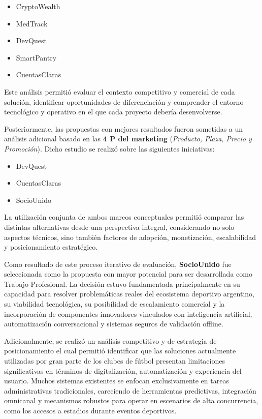 \begin{itemize}
    \item CryptoWealth
    \item MedTrack
    \item DevQuest
    \item SmartPantry
    \item CuentasClaras
\end{itemize}

\newpage

Este análisis permitió evaluar el contexto competitivo y comercial de cada solución, identificar oportunidades de diferenciación y comprender el entorno tecnológico y operativo en el que cada proyecto debería desenvolverse.

Posteriormente, las propuestas con mejores resultados fueron sometidas a un análisis adicional basado en las \textbf{4 P del marketing} (\textit{Producto, Plaza, Precio y Promoción}). Dicho estudio se realizó sobre las siguientes iniciativas:

\begin{itemize}
    \item DevQuest
    \item CuentasClaras
    \item SocioUnido
\end{itemize}

La utilización conjunta de ambos marcos conceptuales permitió comparar las distintas alternativas desde una perspectiva integral, considerando no solo aspectos técnicos, sino también factores de adopción, monetización, escalabilidad y posicionamiento estratégico.

Como resultado de este proceso iterativo de evaluación, \textbf{SocioUnido} fue seleccionada como la propuesta con mayor potencial para ser desarrollada como Trabajo Profesional. La decisión estuvo fundamentada principalmente en su capacidad para resolver problemáticas reales del ecosistema deportivo argentino, su viabilidad tecnológica, su posibilidad de escalamiento comercial y la incorporación de componentes innovadores vinculados con inteligencia artificial, automatización conversacional y sistemas seguros de validación offline.

Adicionalmente, se realizó un análisis competitivo y de estrategia de posicionamiento el cual permitió identificar que las soluciones actualmente utilizadas por gran parte de los clubes de fútbol presentan limitaciones significativas en términos de digitalización, automatización y experiencia del usuario. Muchos sistemas existentes se enfocan exclusivamente en tareas administrativas tradicionales, careciendo de herramientas predictivas, integración omnicanal y mecanismos robustos para operar en escenarios de alta concurrencia, como los accesos a estadios durante eventos deportivos.

